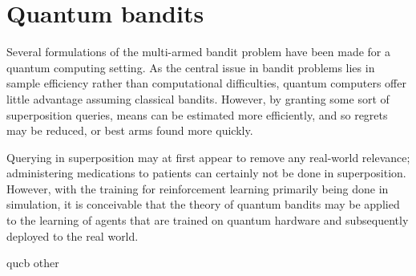 \chapter{Quantum bandits}
\label{chap:qbandits}

Several formulations of the multi-armed bandit problem have been made for a quantum computing setting.
As the central issue in bandit problems lies in sample efficiency rather than computational difficulties, quantum computers offer little advantage assuming classical bandits.
However, by granting some sort of superposition queries, means can be estimated more efficiently, and so regrets may be reduced, or best arms found more quickly.

Querying in superposition may at first appear to remove any real-world relevance; administering medications to patients can certainly not be done in superposition.
However, with the training for reinforcement learning primarily being done in simulation, it is conceivable that the theory of quantum bandits may be applied to the learning of agents that are trained on quantum hardware and subsequently deployed to the real world.

{qucb}
{other}